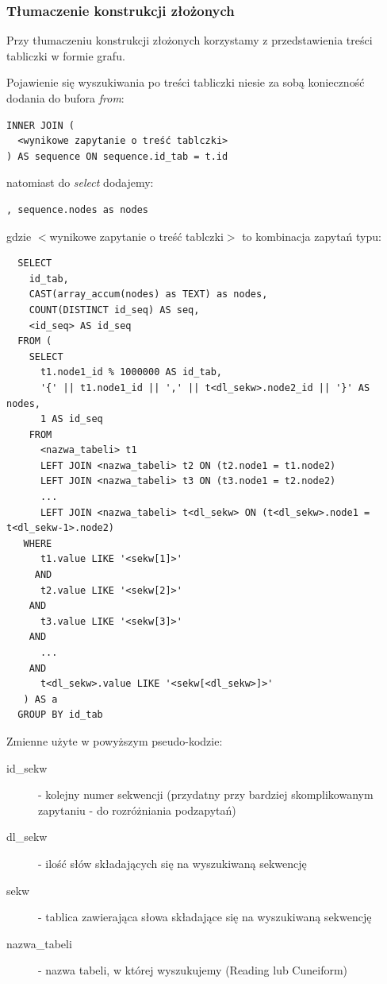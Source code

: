 \documentclass{pracamgr}
\begin{document}
\subsubsection{Tłumaczenie konstrukcji złożonych}
Przy tłumaczeniu konstrukcji złożonych
korzystamy z przedstawienia treści tabliczki w formie grafu.

Pojawienie się wyszukiwania po treści tabliczki niesie za sobą konieczność dodania do bufora \textit{from}:
\begin{verbatim}
INNER JOIN (
  <wynikowe zapytanie o treść tablczki>
) AS sequence ON sequence.id_tab = t.id
\end{verbatim}

natomiast do \textit{select} dodajemy:
\begin{verbatim}
, sequence.nodes as nodes
\end{verbatim}

gdzie $<$wynikowe zapytanie o treść tablczki$>$ to kombinacja zapytań typu:
\begin{verbatim}
  SELECT 
    id_tab, 
    CAST(array_accum(nodes) as TEXT) as nodes, 
    COUNT(DISTINCT id_seq) AS seq, 
    <id_seq> AS id_seq
  FROM (
    SELECT
      t1.node1_id % 1000000 AS id_tab,
      '{' || t1.node1_id || ',' || t<dl_sekw>.node2_id || '}' AS nodes,
      1 AS id_seq
    FROM
      <nazwa_tabeli> t1
      LEFT JOIN <nazwa_tabeli> t2 ON (t2.node1 = t1.node2)
      LEFT JOIN <nazwa_tabeli> t3 ON (t3.node1 = t2.node2)
      ...
      LEFT JOIN <nazwa_tabeli> t<dl_sekw> ON (t<dl_sekw>.node1 = t<dl_sekw-1>.node2)
   WHERE
      t1.value LIKE '<sekw[1]>'
     AND
      t2.value LIKE '<sekw[2]>'
    AND
      t3.value LIKE '<sekw[3]>'
    AND
      ...
    AND
      t<dl_sekw>.value LIKE '<sekw[<dl_sekw>]>'
   ) AS a 
  GROUP BY id_tab
\end{verbatim}
Zmienne użyte w powyższym pseudo-kodzie:
\begin{description}
 \item[id\_sekw] - kolejny numer sekwencji (przydatny przy bardziej skomplikowanym zapytaniu - do rozróżniania podzapytań)
 \item[dl\_sekw] - ilość słów składających się na wyszukiwaną sekwencję
 \item[sekw] - tablica zawierająca słowa składające się na wyszukiwaną sekwencję
\item[nazwa\_tabeli] - nazwa tabeli, w której wyszukujemy (Reading lub Cuneiform)
 \end{description}
\end{document}
